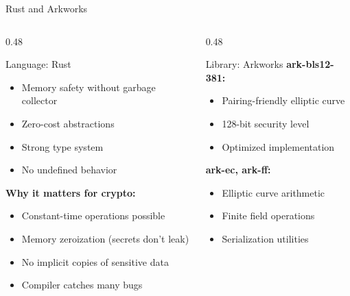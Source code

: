 \documentclass[aspectratio=169,10pt]{beamer}
\begin{document}
\begin{frame}{Rust and Arkworks}
    \begin{columns}[T]
        \begin{column}{0.48\textwidth}
            \begin{block}{Language: Rust}
                \begin{itemize}
                    \item Memory safety without garbage collector
                    \item Zero-cost abstractions
                    \item Strong type system
                    \item No undefined behavior
                \end{itemize}
            \end{block}

            \vspace{0.4em}
            \textbf{Why it matters for crypto:}
            \begin{itemize}
                \item Constant-time operations possible
                \item Memory zeroization (secrets don't leak)
                \item No implicit copies of sensitive data
                \item Compiler catches many bugs
            \end{itemize}
        \end{column}
        \begin{column}{0.48\textwidth}
            \begin{block}{Library: Arkworks}
                \textbf{ark-bls12-381:}
                \begin{itemize}
                    \item Pairing-friendly elliptic curve
                    \item 128-bit security level
                    \item Optimized implementation
                \end{itemize}

                \vspace{0.3em}
                \textbf{ark-ec, ark-ff:}
                \begin{itemize}
                    \item Elliptic curve arithmetic
                    \item Finite field operations
                    \item Serialization utilities
                \end{itemize}
            \end{block}


\end{column}
\end{columns}
\end{frame}
\end{document}
